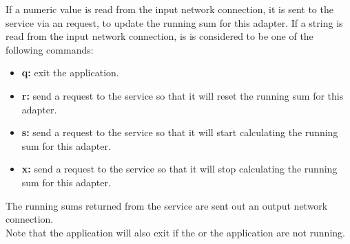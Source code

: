 If a numeric value is read from the input \yarp{} network connection, it is sent to the
service via an  request, to update the running
sum for this adapter.
If a string is read from the input \yarp{} network connection, is is considered to be one
of the following commands:
\begin{itemize}
\item \textbf{q:} exit the application.
\item \textbf{r:} send a  request to the
service so that it will reset the running sum for this adapter.
\item \textbf{s:} send a  request to the
service so that it will start calculating the running sum for this adapter.
\item \textbf{x:} send a  request to the
service so that it will stop calculating the running sum for this adapter.
\end{itemize}
The running sums returned from the service are sent out an output \yarp{} network
connection.\\

Note that the application will also exit if the
 or the
 application are not running.
\secondaryEnd{}
\appendixEnd{}
